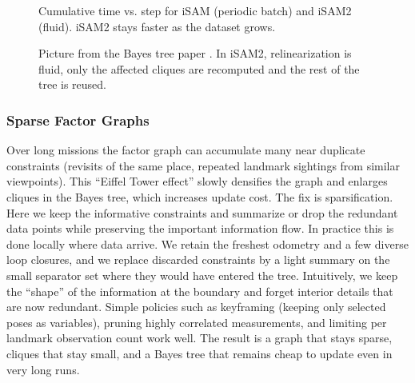 \begin{figure}[H]
\begin{minipage}[t]{0.55\linewidth}
    \caption*{\small Cumulative time vs. step for iSAM (periodic batch) and iSAM2 (fluid). iSAM2 stays faster as the dataset grows.}
  \end{minipage}
  \caption{Picture from the Bayes tree paper \cite{Bayes_tree_for_SLAM_paper}. In iSAM2, relinearization is fluid, only the affected cliques are recomputed and the rest of the tree is reused.}
  \label{fig:optimizer-iSAM2-fluid-relin}
\end{figure}



\subsubsection{Sparse Factor Graphs}
Over long missions the factor graph can accumulate many near duplicate constraints (revisits of the same place, repeated landmark sightings from similar viewpoints). This “Eiffel Tower effect” slowly densifies the graph and enlarges cliques in the Bayes tree, which increases update cost. The fix is sparsification. Here we keep the informative constraints and summarize or drop the redundant data points while preserving the important information flow. In practice this is done locally where data arrive. We retain the freshest odometry and a few diverse loop closures, and we replace discarded constraints by a light summary on the small separator set where they would have entered the tree. Intuitively, we keep the ``shape'' of the information at the boundary and forget interior details that are now redundant. Simple policies such as keyframing (keeping only selected poses as variables), pruning highly correlated measurements, and limiting per landmark observation count work well. The result is a graph that stays sparse, cliques that stay small, and a Bayes tree that remains cheap to update even in very long runs.



